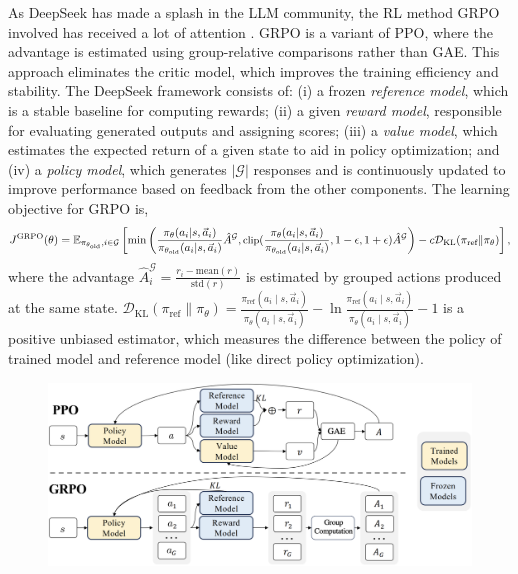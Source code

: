 \documentclass{article} %
\begin{document}
As DeepSeek has made a splash in the LLM community, the RL method GRPO involved has received a lot of attention \cite{deepseek-math}. GRPO is a variant of PPO, where the advantage is estimated using group-relative comparisons rather than GAE. This approach eliminates the critic model, which improves the training efficiency and stability. The DeepSeek framework consists of: (i) a frozen \textit{reference model}, which is a stable baseline for computing rewards; (ii) a given \textit{reward model}, responsible for evaluating generated outputs and assigning scores; (iii) a \textit{value model}, which estimates the expected return of a given state to aid in policy optimization; and (iv) a \textit{policy model}, which generates $|\mathcal{G}|$ responses and is continuously updated to improve performance based on feedback from the other components. The learning objective for GRPO is,
\begin{equation}
\small
J^\text{GRPO}(\theta) = \mathbb{E}_{\pi_{\theta_\text{old}}, i \in \mathcal{G}} \left[ \min \left( \frac{\pi_{\theta}(a_{i} | s, \vec{a}_{i})}{\pi_{\theta_\text{old}}(a_{i} | s, \vec{a}_{i})} \hat{A}^\mathcal{G}, \text{clip}(\frac{\pi_{\theta}(a_{i} | s, \vec{a}_{i})}{\pi_{\theta_\text{old}}(a_{i} | s, \vec{a}_{i})}, 1 - \epsilon, 1 + \epsilon) \hat{A}^{\mathcal{G}}\right)-c\mathcal{D}_\text{KL}(\pi_\text{ref} \| \pi_{\theta})\right],
\end{equation}
where the advantage $\hat{A}^\mathcal{G}_i=\frac{r_i-\text{mean}(r)}{\text{std}(r)}$ is estimated by grouped actions produced at the same state. $\mathcal{D}_\text{KL}(\pi_\text{ref} \| \pi_{\theta})=\frac{\pi_{\text{ref}}(a_{i} \mid s, \vec{a}_{i})}{\pi_{\theta}(a_{i} \mid s, \vec{a}_{i})} 
- \ln \frac{\pi_{\text{ref}}(a_{i} \mid s, \vec{a}_{i})}{\pi_{\theta}(a_{i} \mid s, \vec{a}_i)} - 1$ is a positive unbiased estimator, which measures the difference between the policy of trained model and reference model (like direct policy optimization).

\vspace{5mm}
\begin{figure}[h]
    \centering
    \includegraphics[width=0.8\linewidth]{grpo.png}
    \label{fig:grpo}
\end{figure}

\clearpage



\end{document}
